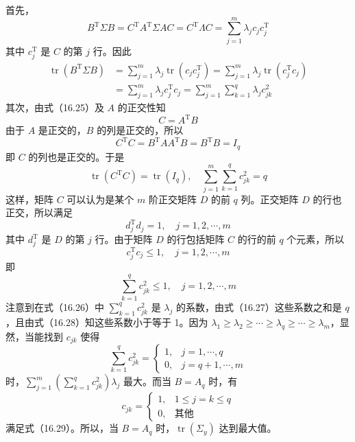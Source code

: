 \documentclass[UTF8, 12pt, fontset=fandol, oneside]{ctexart}
\begin{document}
首先，
\[
B^{\mathrm{T}}\Sigma B=C^{\mathrm{T}}A^{\mathrm{T}}\Sigma AC=C^{\mathrm{T}}\Lambda C=\sum_{j=1}^m\lambda_jc_jc_j^{\mathrm{T}}
\]
其中 $c_j^{\mathrm{T}}$ 是 $C$ 的第 $j$ 行。因此
\begin{equation}
\begin{aligned}
\operatorname{tr}(B^{\mathrm{T}}\Sigma B)
&=\sum_{j=1}^m\lambda_j\operatorname{tr}(c_jc_j^{\mathrm{T}})
=\sum_{j=1}^m\lambda_j\operatorname{tr}(c_j^{\mathrm{T}}c_j)\\
&=\sum_{j=1}^m\lambda_jc_j^{\mathrm{T}}c_j
=\sum_{j=1}^m\sum_{k=1}^q\lambda_jc_{jk}^2
\end{aligned}
\tag{16.26}
\end{equation}
其次，由式（16.25）及 $A$ 的正交性知
\[
C=A^{\mathrm{T}}B
\]
由于 $A$ 是正交的，$B$ 的列是正交的，所以
\[
C^{\mathrm{T}}C=B^{\mathrm{T}}AA^{\mathrm{T}}B=B^{\mathrm{T}}B=I_q
\]
即 $C$ 的列也是正交的。于是
\begin{equation}
\operatorname{tr}(C^{\mathrm{T}}C)=\operatorname{tr}(I_q),\quad
\sum_{j=1}^m\sum_{k=1}^q c_{jk}^2=q
\tag{16.27}
\end{equation}
这样，矩阵 $C$ 可以认为是某个 $m$ 阶正交矩阵 $D$ 的前 $q$ 列。正交矩阵 $D$ 的行也正交，所以满足
\[
d_j^{\mathrm{T}}d_j=1,\quad j=1,2,\cdots,m
\]
其中 $d_j^{\mathrm{T}}$ 是 $D$ 的第 $j$ 行。由于矩阵 $D$ 的行包括矩阵 $C$ 的行的前 $q$ 个元素，所以
\[
c_j^{\mathrm{T}}c_j\leqslant 1,\quad j=1,2,\cdots,m
\]
即
\begin{equation}
\sum_{k=1}^q c_{jk}^2\leqslant 1,\quad j=1,2,\cdots,m
\tag{16.28}
\end{equation}
注意到在式（16.26）中 $\sum_{k=1}^q c_{jk}^2$ 是 $\lambda_j$ 的系数，由式（16.27）这些系数之和是 $q$，且由式（16.28）知这些系数小于等于 1。因为 $\lambda_1\geqslant\lambda_2\geqslant\cdots\geqslant\lambda_q\geqslant\cdots\geqslant\lambda_m$，显然，当能找到 $c_{jk}$ 使得
\begin{equation}
\sum_{k=1}^q c_{jk}^2=
\begin{cases}
1, & j=1,\cdots,q\\
0, & j=q+1,\cdots,m
\end{cases}
\tag{16.29}
\end{equation}
时，$\sum_{j=1}^m\left(\sum_{k=1}^q c_{jk}^2\right)\lambda_j$ 最大。而当 $B=A_q$ 时，有
\[
c_{jk}=
\begin{cases}
1, & 1\leqslant j=k\leqslant q\\
0, & \text{其他}
\end{cases}
\]
满足式（16.29）。所以，当 $B=A_q$ 时，$\operatorname{tr}(\Sigma_y)$ 达到最大值。
\end{document}
